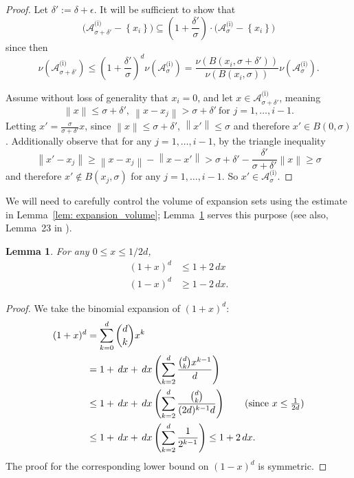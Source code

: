 \documentclass[11pt,twoside]{article}
\newtheorem{lemma}{Lemma}
\newcommand{\set}[1]{\left\{#1\right\}}
\newcommand{\norm}[1]{\left\lVert#1\right\rVert}
\newcommand{\1}{\mathbf{1}}
\newcommand{\Aset}{\mathcal{A}}
\newcommand{\Asig}{\Aset_{\sigma}}
\newcommand{\dx}{\,dx}
\begin{document}
\begin{proof}
	Let $\delta' := \delta + \epsilon$. It will be sufficient to show that
	\begin{equation*}
	\biggl(\Aset_{\sigma + \delta'}^{\text{(i)}} - \set{x_i}\biggr) \subseteq \left(1 + \frac{\delta'}{\sigma}\right)\cdot\biggl(\Asig^{\text{(i)}} - \set{x_i}\biggr) 
	\end{equation*}
	since then
	\begin{equation*}
	\nu(\Aset_{\sigma + \delta'}^{\text{(i)}}) \leq \left(1 + \frac{\delta'}{\sigma}\right)^d \nu(\Aset_{\sigma}^{\text{(i)}}) = \frac{\nu(B(x_i, \sigma + \delta'))}{\nu(B(x_i, \sigma))} \nu(\Aset_{\sigma}^{\text{(i)}}).
	\end{equation*}
	
	Assume without loss of generality that $x_i = 0$, and let $x \in \Aset_{\sigma + \delta'}^{\text{(i)}}$, meaning
	\begin{equation}
	\norm{x} \leq \sigma + \delta',~ \norm{x - x_j} > \sigma + \delta'~ \textrm{for $j = 1, \ldots, i - 1$}.
	\end{equation}
	Letting $x' = \frac{\sigma}{\sigma + \delta'} x$, since $\norm{x} \leq \sigma + \delta'$, $\norm{x'} \leq \sigma$ and therefore $x' \in B(0,\sigma)$. Additionally observe that for any $j = 1, \ldots, i - 1$, by the triangle inequality
	\begin{equation*}
	\norm{x' - x_j} \geq \norm{x - x_j} - \norm{x - x'} > \sigma + \delta' - \frac{\delta'}{\sigma + \delta'}\norm{x} \geq \sigma
	\end{equation*}
	and therefore $x' \not\in B(x_j,\sigma)$ for any $j = 1,\ldots, i - 1$. So $x' \in \Asig^{\text{(i)}}$.
\end{proof}

We will need to carefully control the volume of expansion sets using the estimate in Lemma~\ref{lem: expansion_volume}; Lemma~\ref{lem: Taylor_series} serves this purpose (see also, Lemma~23 in \cite{balakrishnan2013}). 
\begin{lemma}
	\label{lem: Taylor_series}
	For any $0 \leq x \leq 1/2d$,
	\begin{align*}
	(1 + x)^d & \leq 1 + 2\dx \\
	(1 - x)^d & \geq 1 - 2\dx.
	\end{align*}
\end{lemma}
\begin{proof}
	We take the binomial expansion of $(1 + x)^d$:
	\begin{align*}
	(1 + x)^d & = \sum_{k = 0}^{d} {d \choose k} x^k \\
	& = 1 + \dx + \dx\left(\sum_{k = 2}^d \frac{{d \choose k} x^{k - 1}}{d}\right)\\
	& \leq 1 + \dx + \dx\left(\sum_{k = 2}^d \frac{{d \choose k}}{(2d)^{k-1}d}\right) \tag{since $x \leq \frac{1}{2d}$} \\
	& \leq 1 + \dx + \dx\left(\sum_{k = 2}^d \frac{1}{2^{k - 1}}\right) \leq 1 + 2\dx.
	\end{align*}
The proof for the corresponding lower bound on $(1 - x)^d$ is symmetric.
\end{proof}
\end{document}
